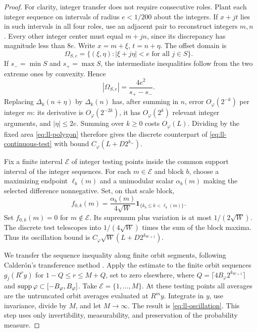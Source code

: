\begin{proof}
For clarity, integer transfer does not require consecutive roles.
Plant each integer sequence on intervals of radius $e<1/200$ about
the integers.  If $x+jt$ lies in such intervals in all four roles,
use an adjacent pair to reconstruct integers $m,n$.  Every other
integer center must equal $m+jn$, since its discrepancy has
magnitude less than $8e$.  Write $x=m+\xi$, $t=n+\eta$.
The offset domain is
\[
 \Omega_{S,e}=\{(\xi,\eta):|\xi+j\eta|<e\text{ for all }j\in S\}.
\]
If $s_-=\min S$ and $s_+=\max S$, the intermediate inequalities
follow from the two extreme ones by convexity.  Hence
\begin{equation}
 |\Omega_{S,e}|=\frac{4e^2}{s_+-s_-}.
 \label{eq:ll-polygon}
\end{equation}
Replacing $\Delta_k(n+\eta)$ by $\Delta_k(n)$ has, after summing
in $n$, error $O_\varphi(2^{-k})$ per integer $m$: its derivative
is $O_\varphi(2^{-2k})$, it has $O_\varphi(2^k)$ relevant integer
arguments, and $|\eta|\le2e$.  Summing over $k\ge0$ costs
$O_\varphi(L)$.  Dividing by the fixed area
\eqref{eq:ll-polygon} therefore gives the discrete counterpart of
\eqref{eq:ll-continuous-test} with bound
$C_\varphi(L+D2^{k_+})$.

Fix a finite interval $\mathcal E$ of integer testing points
inside the common support interval of the integer sequences.
For each $m\in\mathcal E$ and block $b$, choose a maximizing
endpoint $\ell_b(m)$ and a unimodular scalar $\alpha_b(m)$ making
the selected difference nonnegative.  Set, on that scale block,
\[
f_{0,k}(m)=\frac{\alpha_b(m)}{4\sqrt W}
       \mathbf1_{\{k_b\le k<\ell_b(m)\}}.
\]
Set $f_{0,k}(m)=0$ for $m\notin\mathcal E$.
Its supremum plus variation is at most $1/(2\sqrt W)$.
The discrete test telescopes into $1/(4\sqrt W)$ times the sum
of the block maxima.  Thus its oscillation bound is
$C_\varphi\sqrt W(L+D2^{k_{W+1}})$.

We transfer the sequence inequality along finite orbit segments,
following Calder\'on's transference method \cite{Calderon}.
Apply the estimate to the finite orbit sequences
$g_j(R^r y)$ for $1-Q\le r\le M+Q$, set to zero elsewhere, where
$Q=\lceil4B_\varphi2^{k_{W+1}}\rceil$ and
$\operatorname{supp}\varphi\subset[-B_\varphi,B_\varphi]$.
Take $\mathcal E=\{1,\ldots,M\}$.  At these testing points all
averages are the untruncated
orbit averages evaluated at $R^m y$.  Integrate in $y$, use
invariance, divide by $M$, and let $M\to\infty$.  The result is
\eqref{eq:ll-oscillation}.  This step uses only invertibility,
measurability, and preservation of the probability measure.
\end{proof}


